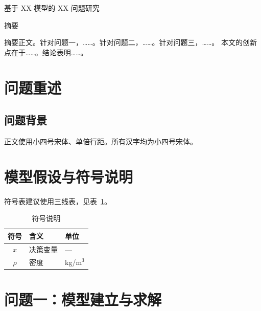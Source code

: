 \documentclass[UTF8,a4paper,zihao=-4]{ctexart}
\numberwithin{figure}{section}
\numberwithin{table}{section}
\numberwithin{equation}{section}
\begin{document}
\begin{center}
  {\heiti{} 基于 XX 模型的 XX 问题研究}   %
\end{center}
\vspace{1em}

\begin{center}
  {\heiti{} 摘\quad 要}
\end{center}

摘要正文。针对问题一，……。针对问题二，……。针对问题三，……。
本文的创新点在于……。结论表明……。

\vspace{0.6em}

\newpage

\section{问题重述}

\subsection{问题背景}

正文使用小四号宋体、单倍行距。所有汉字均为小四号宋体。

\section{模型假设与符号说明}

符号表建议使用三线表，见表~\ref{tab:symbols}。

\begin{table}[htbp]
  \centering
  \caption{符号说明}
  \label{tab:symbols}
  \begin{tabular}{cll}
    \toprule
    符号 & 含义 & 单位 \\
    \midrule
    $x$        & 决策变量 & --- \\
    $\rho$     & 密度     & kg/m$^3$ \\
    \bottomrule
  \end{tabular}
\end{table}

\section{问题一：模型建立与求解}
\end{document}

